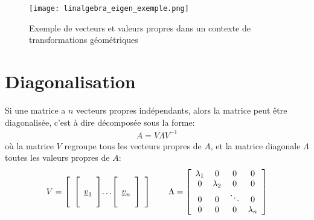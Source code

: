 \begin{figure}[H]
	\centering
	\texttt{[image: linalgebra\_eigen\_exemple.png]}
	\caption{Exemple de vecteurs et valeurs propres dans un contexte de transformations géométriques}
	\label{fig:linalgebra_eigen_exemple}
\end{figure}

\section{Diagonalisation}

Si une matrice a $n$ vecteurs propres indépendants, alors la matrice peut être diagonalisée, c'est à dire décomposée sous la forme:
\begin{align}
	A = V \Lambda V^{-1}
	\label{eq:diagmatrix}
\end{align}
où la matrice $V$ regroupe tous les vecteurs propres de $A$, et la matrice diagonale $\Lambda$ toutes les valeurs propres  de $A$:
\begin{align}
	V =
	\left[ \begin{array}{c@{}c@{}c}
			   \left[  \begin{array}{c}  \\ \underline{v}_1 \\ \\ \end{array} \right] &  \ldots & \left[  \begin{array}{c} \\ \underline{v}_n \\ \\ \end{array} \right]
	\end{array} \right]
	\quad \quad
	\Lambda =
	\left[ \begin{array}{c c c c}
			   \lambda_1 &  0          & 0 & 0 \\
			   0         &  \lambda_2  & 0      & 0 \\
			   0         &  0          &\ddots  & 0 \\
			   0         &  0          & 0  & \lambda_n
	\end{array} \right]
\end{align}


